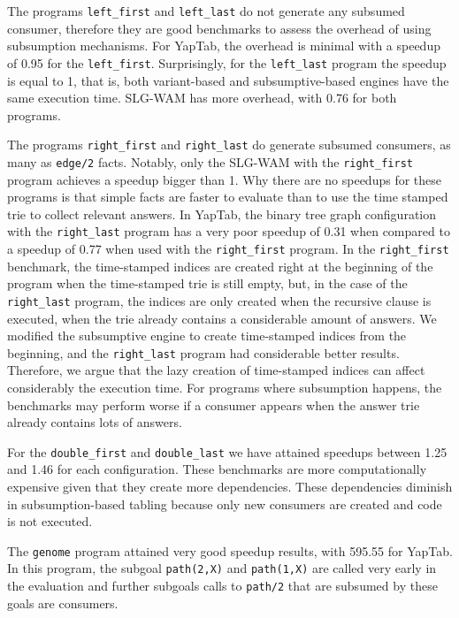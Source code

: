 The programs \texttt{left\_first} and \texttt{left\_last} do not generate any subsumed consumer,
therefore they are good benchmarks to assess the overhead of using subsumption mechanisms. For YapTab,
the overhead is minimal with a speedup of 0.95 for the \texttt{left\_first}. Surprisingly, for the
\texttt{left\_last} program the speedup is equal to 1, that is, both variant-based and subsumptive-based
engines have the same execution time. SLG-WAM has more overhead, with 0.76 for both programs.

The programs \texttt{right\_first} and \texttt{right\_last} do generate subsumed consumers,
as many as \texttt{edge/2} facts. Notably, only the SLG-WAM with the \texttt{right\_first} program
achieves a speedup bigger than 1. Why there are no speedups for these programs is that simple facts
are faster to evaluate than to use the time stamped trie to collect relevant answers.
In YapTab, the binary tree graph configuration with the \texttt{right\_last} program has a very poor speedup
of 0.31 when compared to a speedup of 0.77 when used with the \texttt{right\_first} program.
In the \texttt{right\_first} benchmark, the time-stamped indices are created right at
the beginning of the program when the time-stamped trie is still empty, but, in the case of the \texttt{right\_last}
program, the indices are only created when the recursive clause is executed, when the trie already contains
a considerable amount of answers. We modified the subsumptive engine to create time-stamped indices from the
beginning, and the \texttt{right\_last} program had considerable better results. Therefore, we argue that the
lazy creation of time-stamped indices can affect considerably the execution time. For programs where subsumption
happens, the benchmarks may perform worse if a consumer appears when the answer trie already contains lots of answers.

For the \texttt{double\_first} and \texttt{double\_last} we have attained speedups between 1.25 and 1.46
for each configuration. These benchmarks are more computationally expensive given that they create more
dependencies. These dependencies diminish in subsumption-based tabling because only new consumers are created
and code is not executed.

The \texttt{genome} program attained very good speedup results, with
595.55 for YapTab. In this program, the subgoal \texttt{path(2,X)} and \texttt{path(1,X)} are called
very early in the evaluation and further subgoals calls to \texttt{path/2} that are subsumed by these
goals are consumers.

